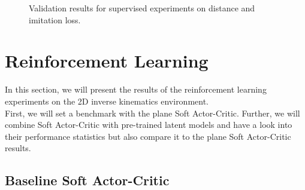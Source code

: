 \begin{figure}[h]
    \begin{center}
        \hfill
    \end{center}
    \caption[Supervised Distance and Imitation Loss]{Validation results for supervised experiments on distance and imitation loss. }
    \label{fig:supervised_imitation}
\end{figure}

\section{Reinforcement Learning}

In this section, we will present the results of the reinforcement learning experiments on the 2D inverse kinematics environment. \\
First, we will set a benchmark with the plane Soft Actor-Critic. Further, we will combine Soft Actor-Critic with pre-trained latent models and have a look into their performance statistics but also compare it to the plane Soft Actor-Critic results. 

\subsection{Baseline Soft Actor-Critic}

